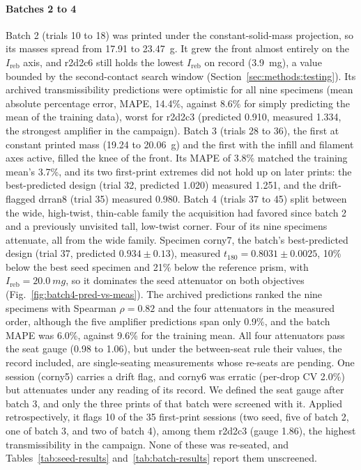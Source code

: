 \documentclass[11pt]{article}
\begin{document}
\paragraph{Batches 2 to 4} Batch 2 (trials 10 to 18) was printed under
the constant-solid-mass projection, so its masses spread from 17.91 to
\SI{23.47}{g}. It grew the front almost entirely on the
$I_{\mathrm{reb}}$ axis, and r2d2c6 still holds the lowest
$I_{\mathrm{reb}}$ on record (\SI{3.9}{mg}), a value bounded by the
second-contact search window (Section~\ref{sec:methods:testing}). Its archived
transmissibility predictions were optimistic for all nine specimens
(mean absolute percentage error, MAPE, 14.4\%, against 8.6\% for simply
predicting the mean of the training data), worst for r2d2c3 (predicted
0.910, measured 1.334, the strongest amplifier in the campaign). Batch 3
(trials 28 to 36), the first at constant printed mass (19.24 to
\SI{20.06}{g}) and the first with the infill and filament axes active,
filled the knee of the front. Its MAPE of 3.8\% matched the training
mean's 3.7\%, and its two first-print extremes did not hold up on later
prints: the best-predicted design (trial 32, predicted 1.020) measured
1.251, and the drift-flagged drran8 (trial 35) measured 0.980. Batch 4
(trials 37 to 45) split between the wide, high-twist, thin-cable family
the acquisition had favored since batch 2 and a previously unvisited
tall, low-twist corner. Four of its nine specimens attenuate, all from
the wide family. Specimen corny7, the batch's best-predicted design
(trial 37, predicted $0.934 \pm 0.13$), measured
$t_{180} = 0.8031 \pm 0.0025$, 10\% below the best seed specimen and
21\% below the reference prism, with $I_{\mathrm{reb}} = \SI{20.0}{mg}$,
so it dominates the seed attenuator on both objectives
(Fig.~\ref{fig:batch4-pred-vs-meas}). The archived predictions ranked
the nine specimens with Spearman $\rho = 0.82$ and the four attenuators
in the measured order, although the five amplifier predictions span only
0.9\%, and the batch MAPE was 6.0\%, against 9.6\% for the training mean. All four attenuators pass the seat
gauge (0.98 to 1.06), but under the between-seat rule their values,
the record included, are single-seating measurements whose re-seats
are pending. One session (corny5) carries a drift flag, and corny6 was
erratic (per-drop CV 2.0\%) but attenuates under any reading of its
record. We defined the seat gauge after batch 3, and only the three
prints of that batch were screened with it. Applied retrospectively, it
flags 10 of the 35 first-print sessions (two seed, five of batch 2, one
of batch 3, and two of batch 4), among them r2d2c3 (gauge 1.86), the
highest transmissibility in the campaign. None of these was re-seated,
and Tables~\ref{tab:seed-results} and~\ref{tab:batch-results} report
them unscreened.
\end{document}
